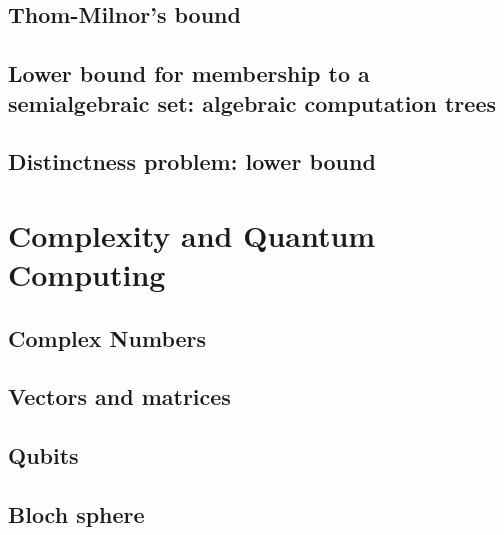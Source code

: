 \documentclass{article}
\theoremstyle{definition}
\begin{document}
\subsection{Thom-Milnor’s bound}
\subsection{Lower bound for membership to a semialgebraic set: algebraic computation trees}
\subsection{Distinctness problem: lower bound}

\pagebreak
\section{Complexity and Quantum Computing}
\subsection{Complex Numbers}
\subsection{Vectors and matrices}
\subsection{Qubits}
\subsection{Bloch sphere}
\end{document}
